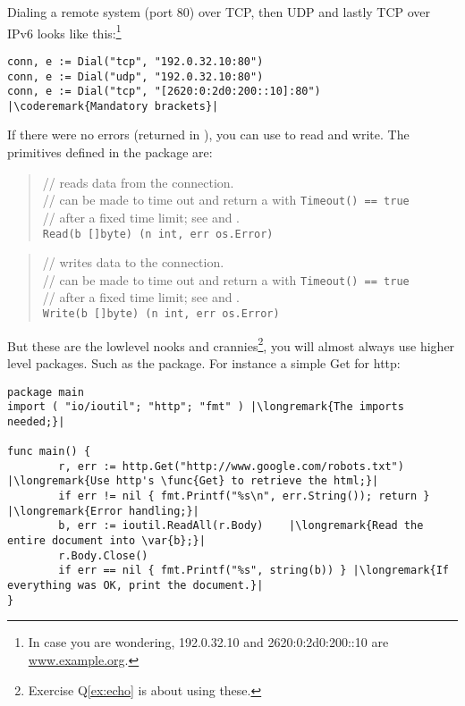Dialing a remote system (port 80) over TCP, then UDP and lastly TCP over IPv6 looks
like this:\footnote{In case
you are wondering, 192.0.32.10 and 2620:0:2d0:200::10 are \url{www.example.org}.}
\begin{lstlisting}
conn, e := Dial("tcp", "192.0.32.10:80")
conn, e := Dial("udp", "192.0.32.10:80")
conn, e := Dial("tcp", "[2620:0:2d0:200::10]:80") |\coderemark{Mandatory brackets}|
\end{lstlisting}

If there were no errors (returned in ), you can use  to read and write.
The primitives defined in the package  are:
\begin{quote}
//  reads data from the connection.\\
//  can be made to time out and return a  with \lstinline{Timeout() == true}\\
// after a fixed time limit; see  and .\\
\lstinline{Read(b []byte) (n int, err os.Error)}
\end{quote}

\begin{quote}
//  writes data to the connection.\\
//  can be made to time out and return a  with \lstinline{Timeout() == true}\\
// after a fixed time limit; see  and .\\
\lstinline{Write(b []byte) (n int, err os.Error)}
\end{quote}

But these are the lowlevel nooks and crannies\footnote{Exercise Q\ref{ex:echo} is about using
these.}, you will almost always use higher level packages.
Such as the  package. For instance a simple Get for http:
\begin{lstlisting}
package main
import ( "io/ioutil"; "http"; "fmt" ) |\longremark{The imports needed;}|

func main() {
        r, err := http.Get("http://www.google.com/robots.txt") |\longremark{Use http's \func{Get} to retrieve the html;}|
        if err != nil { fmt.Printf("%s\n", err.String()); return } |\longremark{Error handling;}|
        b, err := ioutil.ReadAll(r.Body)    |\longremark{Read the entire document into \var{b};}|
        r.Body.Close()  
        if err == nil { fmt.Printf("%s", string(b)) } |\longremark{If everything was OK, print the document.}|
}
\end{lstlisting}
\showremarks


